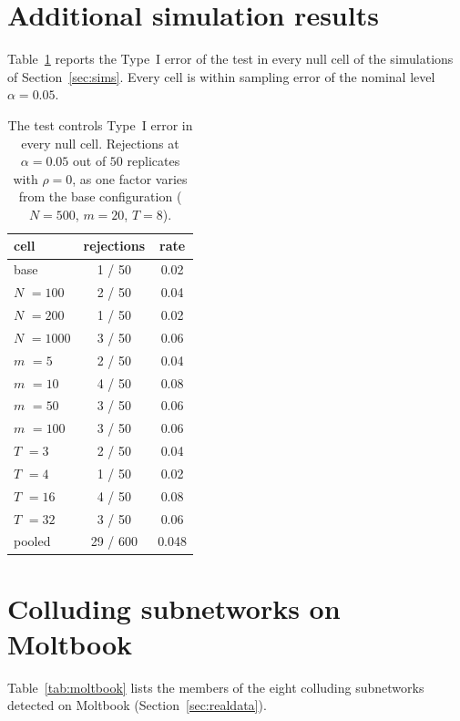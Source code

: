 \documentclass{article}
\theoremstyle{plain}
\theoremstyle{definition}
\begin{document}
\FloatBarrier



\newpage
\appendix
\onecolumn
\section{Additional simulation results}
\label{app:sims}

Table~\ref{tab:typeI} reports the Type~I error of the test in every null cell of the simulations of Section~\ref{sec:sims}. Every cell is within sampling error of the nominal level $\alpha=0.05$.

\begin{table}[h]
\centering
\caption{The test controls Type~I error in every null cell. Rejections at $\alpha=0.05$ out of $50$ replicates with $\rho=0$, as one factor varies from the base configuration ($N=500$, $m=20$, $T=8$).}
\label{tab:typeI}
\begin{tabular}{@{}lcc@{}}
\toprule
cell & rejections & rate \\
\midrule
base & 1 / 50 & 0.02 \\
$N$ $= 100$ & 2 / 50 & 0.04 \\
$N$ $= 200$ & 1 / 50 & 0.02 \\
$N$ $= 1000$ & 3 / 50 & 0.06 \\
$m$ $= 5$ & 2 / 50 & 0.04 \\
$m$ $= 10$ & 4 / 50 & 0.08 \\
$m$ $= 50$ & 3 / 50 & 0.06 \\
$m$ $= 100$ & 3 / 50 & 0.06 \\
$T$ $= 3$ & 2 / 50 & 0.04 \\
$T$ $= 4$ & 1 / 50 & 0.02 \\
$T$ $= 16$ & 4 / 50 & 0.08 \\
$T$ $= 32$ & 3 / 50 & 0.06 \\
\midrule
pooled & 29 / 600 & 0.048 \\
\bottomrule
\end{tabular}
\end{table}

\section{Colluding subnetworks on Moltbook}
\label{app:moltbook}

Table~\ref{tab:moltbook} lists the members of the eight colluding subnetworks detected on Moltbook (Section~\ref{sec:realdata}).
\end{document}
